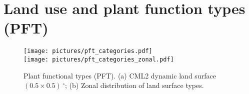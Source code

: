 \documentclass[gmd, manuscript]{copernicus}
\begin{document}
\section{Land use and plant function types (PFT)}    %
\appendixfigures
\begin{figure*}[!htbp]
  \centering
  \texttt{[image: pictures/pft\_categories.pdf]}\\
  \texttt{[image: pictures/pft\_categories\_zonal.pdf]}
  \caption{Plant functional types (PFT). (a) CML2 dynamic land surface $(0.5\times0.5)\,\unit{^\circ}$; (b) Zonal distribution of land surface types.}
  \label{fig:pft_landsurface}
\end{figure*}











\end{document}
